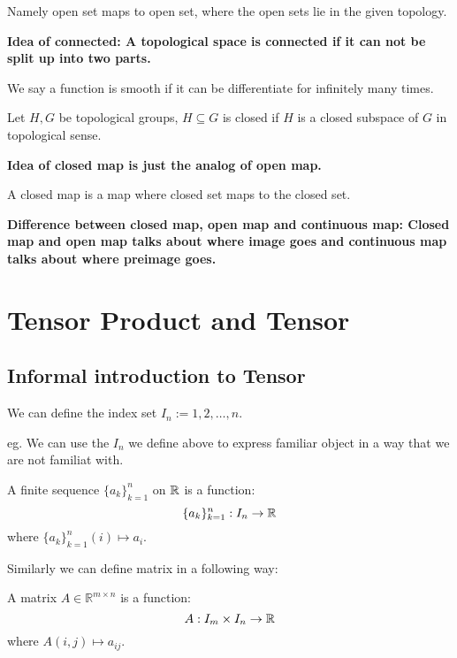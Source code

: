 \documentclass[11pt]{article}
\begin{document}
Namely open set maps to open set, where the open sets lie in the given topology.

\textbf{Idea of connected: A topological space is connected if it can not be split up into two parts.}

\begin{definition}[Smooth]
We say a function is smooth if it can be differentiate for infinitely many times.
\end{definition}

\begin{definition}
Let \(H,G\) be topological groups, \(H \subseteq G\) is closed if \(H\) is a closed subspace of \(G\) in topological sense.
\end{definition}

\textbf{Idea of closed map is just the analog of open map.}

\begin{definition}
A closed map is a map where closed set maps to the closed set.
\end{definition}

\textbf{Difference between closed map, open map and continuous map: Closed map and open map talks about where image goes and continuous map talks about where preimage goes.}
\section{Tensor Product and Tensor}
\label{sec:org695a90a}
\subsection{Informal introduction to Tensor}
\label{sec:org9436e0d}
\begin{definition}
We can define the index set \(I_n := {1,2,\dots,n}\).
\end{definition}

eg. We can use the \(I_n\) we define above to express familiar object in a way that we are not familiat with.

\begin{definition}[Sequence]
A finite sequence \(\{a_k\}_{k = 1}^n\) on \(\mathbb{R}\) is a function:
\[
\{a_k\}_{k = 1}^n : I_n \to \mathbb{R}
\]
where \(\{a_k\}_{k = 1}^n(i) \mapsto a_i\).
\end{definition}

Similarly we can define matrix in a following way:
\begin{definition}[Matrix]
A matrix \(A \in \mathbb{R}^{m\times n}\) is a function:
\[
A : I_m \times I_n \to \mathbb{R}
\]
where \(A(i,j) \mapsto a_{ij}\).
\end{definition}
\end{document}
